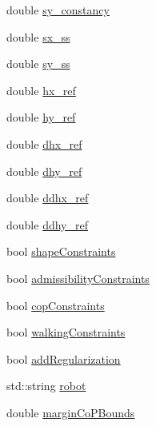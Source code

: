 \begin{DoxyCompactItemize}
\item 
double \hyperlink{structMIQPParameters_a1dd5e07b3f05ddf30ecbe878caf4de38}{sy\-\_\-constancy}
\item 
double \hyperlink{structMIQPParameters_af8a016a12ecffd0751307c7d869472e9}{sx\-\_\-ss}
\item 
double \hyperlink{structMIQPParameters_a3c473019e93f8191f288edfe6999f4c1}{sy\-\_\-ss}
\item 
double \hyperlink{structMIQPParameters_a0346212871459ae33b79af6f9af49d5f}{hx\-\_\-ref}
\item 
double \hyperlink{structMIQPParameters_a09fe82db83af3f8ab0e891968daa7996}{hy\-\_\-ref}
\item 
double \hyperlink{structMIQPParameters_a97a8deb8aeda727c99dc501b4516a24e}{dhx\-\_\-ref}
\item 
double \hyperlink{structMIQPParameters_a816bb15b6417ac8387adbaac2f74e198}{dhy\-\_\-ref}
\item 
double \hyperlink{structMIQPParameters_a71dab92bc2eebbdf5e2d592c092e7f52}{ddhx\-\_\-ref}
\item 
double \hyperlink{structMIQPParameters_a996553605ecfefa749bde01bc4e7b2a9}{ddhy\-\_\-ref}
\item 
bool \hyperlink{structMIQPParameters_a718ac69205eb5fbb51f58cd59176a3ff}{shape\-Constraints}
\item 
bool \hyperlink{structMIQPParameters_ae8e541722b3e3664ab516676aa1c16be}{admissibility\-Constraints}
\item 
bool \hyperlink{structMIQPParameters_a3a0fd04f9e8767097e44e02a740796bc}{cop\-Constraints}
\item 
bool \hyperlink{structMIQPParameters_af7cbaa08836e17417f9f5c170b55f1bc}{walking\-Constraints}
\item 
bool \hyperlink{structMIQPParameters_a7e5417e18e6797739def8f916c3efc40}{add\-Regularization}
\item 
std\-::string \hyperlink{structMIQPParameters_af2f4673b548e119f30a7e90baac268f5}{robot}
\item 
double \hyperlink{structMIQPParameters_a5befafbd8312ce18fc57bf32ccb6a16c}{margin\-Co\-P\-Bounds}
\end{DoxyCompactItemize}



